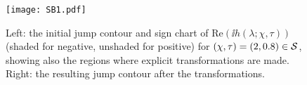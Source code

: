
\begin{figure}[h]
\begin{center}
\texttt{[image: SB1.pdf]}
\end{center}
\caption{Left:  the initial jump contour and sign chart of $\mathrm{Re}(\ii h(\lambda;\chi,\tau))$ (shaded for negative, unshaded for positive) for $(\chi,\tau)=(2,0.8)\in \mathcal{S}$, showing also the regions where explicit transformations are made.  Right:  the resulting jump contour after the transformations.}
\label{fig:SB1}
\end{figure}

